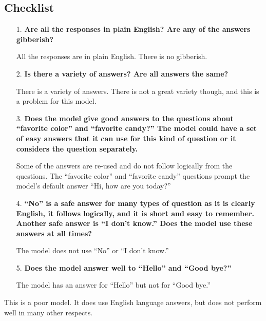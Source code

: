 \subsection{Checklist}

\begin{itemize}
	\item [1.] \textbf{Are all the responses in plain English? Are any of the answers gibberish?}
	
	\item []All the responses are in plain English. There is no gibberish.
	
	\item [2.] \textbf{Is there a  variety of answers? Are all answers the same?}
	
	\item []There is a variety of answers. There is not a great variety though, and this is a problem for this model.
	
	\item [3.] \textbf{Does the model give good answers to the questions about ``favorite color'' and ``favorite candy?'' The model could have a set of easy answers that it can use for this kind of question or it considers the question separately.} 
	
	\item []Some of the answers are re-used and do not follow logically from the questions. The ``favorite color'' and ``favorite candy'' questions prompt the model's default answer ``Hi, how are you today?'' 
	
	\item [4.] \textbf{``No'' is a safe answer for many types of question as it is clearly English, it follows logically, and it is short and easy to remember. Another safe answer is ``I don't know.'' Does the model use these answers at all times?}
	
	\item []The model does not use ``No'' or ``I don't know.''
	
	\item [5.] \textbf{Does the model answer well to ``Hello'' and ``Good bye?''}
	
	\item []The model has an answer for ``Hello'' but not for ``Good bye.''
	
\end{itemize}

This is a poor model. It does use English language answers, but does not perform well in many other respects.

